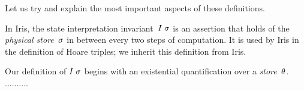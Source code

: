 
Let us try and explain the most important aspects of these definitions.

In Iris, the state interpretation invariant~$I\;\sigma$ is an assertion that
holds of the \emph{physical store}~$\sigma$ in between every two steps of
computation. It is used by Iris in the definition of Hoare triples; we inherit
this definition from Iris.

Our definition of $I\;\sigma$ begins with an existential quantification over
a \emph{\logical store}~$\theta$.
..........
